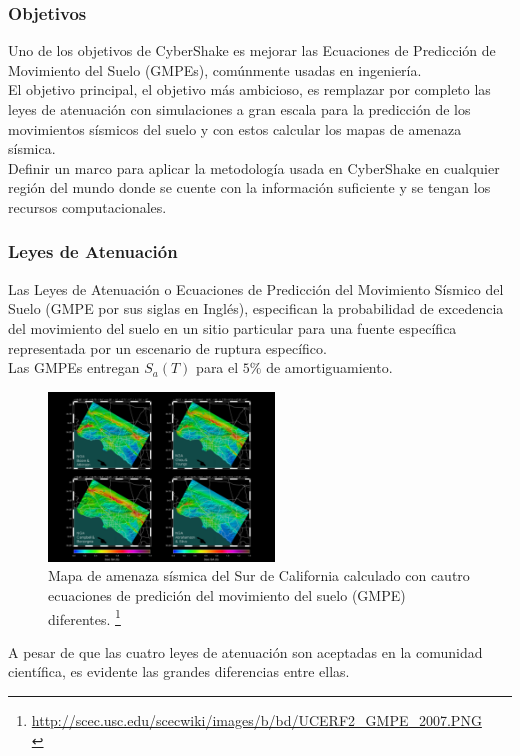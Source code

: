 %
%
\begin{frame}%
\frametitle{Objetivos}
%
\justifying
%
Uno de los objetivos de CyberShake es mejorar las Ecuaciones de Predicción de Movimiento del Suelo (GMPEs), comúnmente usadas en ingeniería.\\
%
El objetivo principal, el objetivo más ambicioso, es remplazar por completo las leyes de atenuación con simulaciones a gran escala para la predicción de los movimientos sísmicos del suelo y con estos calcular los mapas de amenaza sísmica.\\
%
Definir un marco para aplicar la metodología usada en CyberShake en cualquier región del mundo donde se cuente con la información suficiente y se tengan los recursos computacionales.
%
%
\end{frame}
%
%
\begin{frame}[allowframebreaks]\frametitle{Leyes de Atenuación}
%
\justifying
%
Las Leyes de Atenuación o Ecuaciones de Predicción del Movimiento Sísmico del Suelo (GMPE por sus siglas en Inglés), especifican la probabilidad de excedencia del movimiento del suelo en un sitio particular para una fuente específica representada por un escenario de ruptura específico.\\
%
Las GMPEs entregan $S_a \left( T \right)$ para el $5\%$ de amortiguamiento.\\
%
\begin{figure}[h]
	\centering
	\includegraphics[height=4.5cm]{img/UCERF2_GMPE_2007.pdf}
	\caption{Mapa de amenaza sísmica del Sur de California calculado con cautro ecuaciones de predición del movimiento del suelo (GMPE) diferentes. \footnote{ \tiny\url{http://scec.usc.edu/scecwiki/images/b/bd/UCERF2_GMPE_2007.PNG}\\}}
	\vspace{-.5 cm}
\end{figure}
%
\justifying
%
A pesar de que las cuatro leyes de atenuación son aceptadas en la comunidad científica, es evidente las grandes diferencias entre ellas.\\
%
%
\end{frame}
